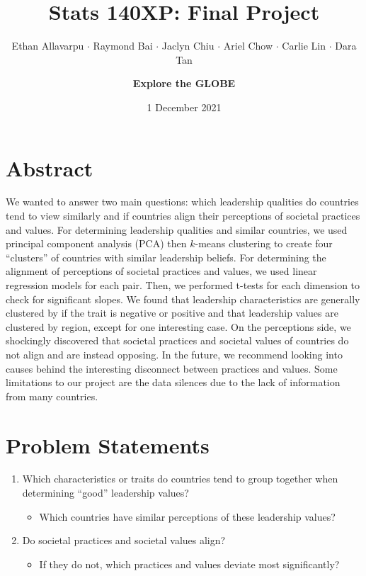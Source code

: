 \documentclass[
]{article}
\title{Stats 140XP: Final Project}
\author{Ethan Allavarpu \(\cdot\) Raymond Bai \(\cdot\) Jaclyn Chiu
\(\cdot\) Ariel Chow \(\cdot\) Carlie Lin \(\cdot\) Dara
Tan \and \textbf{Explore the GLOBE}}
\date{1 December 2021}
\providecommand{\tightlist}{%
  \setlength{\itemsep}{0pt}\setlength{\parskip}{0pt}}
\begin{document}
\maketitle

{
\setcounter{tocdepth}{1}
\tableofcontents
}
\vfill

\newpage

\hypertarget{abstract}{%
\section{Abstract}\label{abstract}}

We wanted to answer two main questions: which leadership qualities do
countries tend to view similarly and if countries align their
perceptions of societal practices and values. For determining leadership
qualities and similar countries, we used principal component analysis
(PCA) then \(k\)-means clustering to create four ``clusters'' of
countries with similar leadership beliefs. For determining the alignment
of perceptions of societal practices and values, we used linear
regression models for each pair. Then, we performed t-tests for each
dimension to check for significant slopes. We found that leadership
characteristics are generally clustered by if the trait is negative or
positive and that leadership values are clustered by region, except for
one interesting case. On the perceptions side, we shockingly discovered
that societal practices and societal values of countries do not align
and are instead opposing. In the future, we recommend looking into
causes behind the interesting disconnect between practices and values.
Some limitations to our project are the data silences due to the lack of
information from many countries.

\hypertarget{problem-statements}{%
\section{Problem Statements}\label{problem-statements}}

\begin{enumerate}
\def\labelenumi{\arabic{enumi}.}
\tightlist
\item
  Which characteristics or traits do countries tend to group together
  when determining ``good'' leadership values?

  \begin{itemize}
  \tightlist
  \item
    Which countries have similar perceptions of these leadership values?
  \end{itemize}
\item
  Do societal practices and societal values align?

  \begin{itemize}
  \tightlist
  \item
    If they do not, which practices and values deviate most
    significantly?
  \end{itemize}
\end{enumerate}
\end{document}
